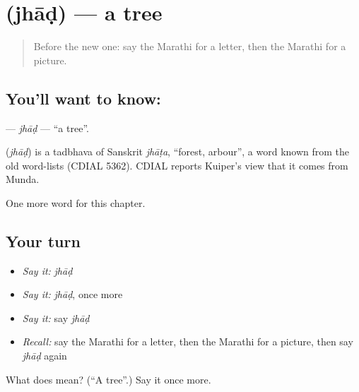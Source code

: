 \section[\texorpdfstring{\mr{झाड} (jhāḍ)}{झाड (jhāḍ)}]{ (jhāḍ) — a tree}

\label{lesson:MR-C95-jhad}



\begin{quote}
Before the new one: say the Marathi for a letter, then the Marathi for a picture.
\end{quote}

\subsection*{You'll want to know: }
\textbf{} — \emph{jhāḍ} — \textquotedblleft{}a tree\textquotedblright{}.

\begin{cousinweb}
\textbf{} (\emph{jhāḍ}) is a tadbhava of Sanskrit \emph{jhāṭa}, \textquotedblleft{}forest, arbour\textquotedblright{}, a word known from the old word-lists (CDIAL 5362). CDIAL reports Kuiper's view that it comes from Munda.
\end{cousinweb}

\begin{grammarlens}[title={What you've built}]
One more word for this chapter.
\end{grammarlens}

\subsection*{Your turn}
\begin{itemize}
\raggedright
  \item \emph{Say it:} \emph{jhāḍ}
  \item \emph{Say it:} \emph{jhāḍ}, once more
  \item \emph{Say it:} say \emph{jhāḍ}
  \item \emph{Recall:} say the Marathi for a letter, then the Marathi for a picture, then say \emph{jhāḍ} again
\end{itemize}

\begin{tcolorbox}[breakable,colback=teal!4,colframe=teal!35!black,title={Before you move on}]
What does  mean? (\textquotedblleft{}A tree\textquotedblright{}.) Say it once more.
\end{tcolorbox}
